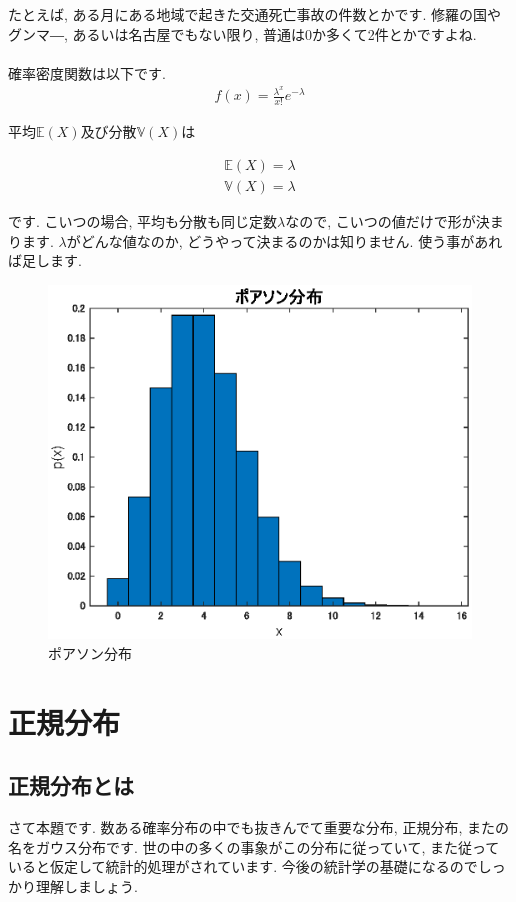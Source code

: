\documentclass[11pt,a4paper,uplatex]{ujreport} 	%
\begin{document}
たとえば, ある月にある地域で起きた交通死亡事故の件数とかです. 修羅の国やグンマ―, あるいは名古屋でもない限り, 普通は0か多くて2件とかですよね.\\
\\

確率密度関数は以下です.
\begin{align}
f(x) = \frac{\lambda^x}{x!}e^{-\lambda}
\end{align}

平均$\mathbb{E}(X)$及び分散$\mathbb{V}(X)$は

\begin{align}
\mathbb{E}(X) = \lambda\\
\mathbb{V}(X) = \lambda
\end{align}

です. こいつの場合, 平均も分散も同じ定数$\lambda$なので, こいつの値だけで形が決まります. $\lambda$がどんな値なのか, どうやって決まるのかは知りません. 使う事があれば足します.\\

\begin{figure}[H]
\label{im:poisson}
  \centering
  \includegraphics[width=15cm]{../figures/poisson.eps}
  \caption{ポアソン分布}
\end{figure}

\section{正規分布}
\subsection{正規分布とは}
さて本題です. 数ある確率分布の中でも抜きんでて重要な分布, 正規分布, またの名をガウス分布です. 世の中の多くの事象がこの分布に従っていて, また従っていると仮定して統計的処理がされています. 今後の統計学の基礎になるのでしっかり理解しましょう.\\
\\
\end{document}
